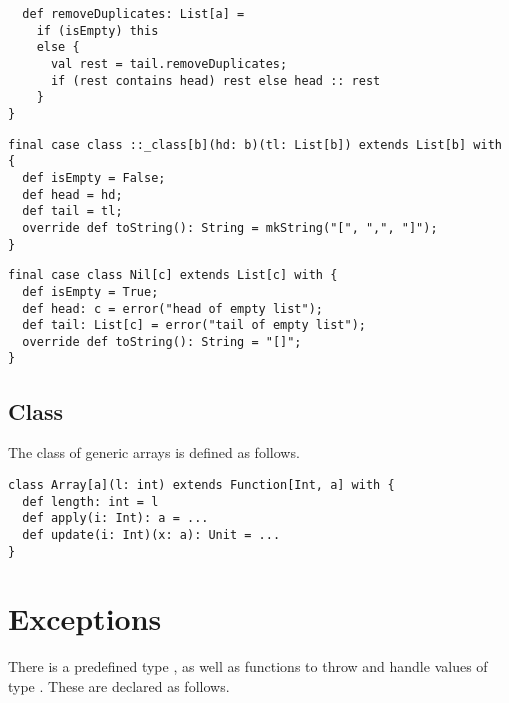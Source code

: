 \documentclass[11pt]{report}
\begin{document}
\begin{itemize}
\begin{verbatim}
  def removeDuplicates: List[a] =
    if (isEmpty) this
    else {
      val rest = tail.removeDuplicates;
	  if (rest contains head) rest else head :: rest
    }
}
\end{verbatim}
\begin{verbatim}
final case class ::_class[b](hd: b)(tl: List[b]) extends List[b] with {
  def isEmpty = False;
  def head = hd;
  def tail = tl;
  override def toString(): String = mkString("[", ",", "]");
}
\end{verbatim}
\begin{verbatim}
final case class Nil[c] extends List[c] with {
  def isEmpty = True;
  def head: c = error("head of empty list");
  def tail: List[c] = error("tail of empty list");
  override def toString(): String = "[]";
}
\end{verbatim}

\subsection{Class }

The class of generic arrays is defined as follows.

\begin{verbatim}
class Array[a](l: int) extends Function[Int, a] with {
  def length: int = l
  def apply(i: Int): a = ...
  def update(i: Int)(x: a): Unit = ...
}
\end{verbatim}
\section{Exceptions}
\label{sec:exceptions}

There is a predefined type \verb@Throwable@, as well as functions to
throw and handle values of type \verb@Throwable@. These are declared
as follows.


\end{itemize}
\end{document}
